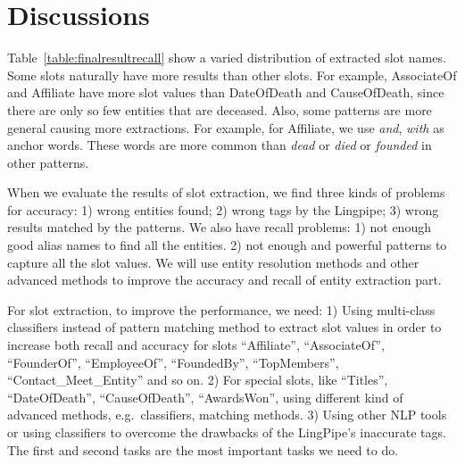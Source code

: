 

\section{Discussions}


Table~\ref{table:finalresultrecall} show a varied distribution of extracted slot names. Some slots naturally have more results than other slots. For example, AssociateOf and Affiliate have more slot values than DateOfDeath and CauseOfDeath, since there are only so few entities that are deceased. Also, some patterns are more general causing more extractions. For example, for Affiliate, we use \textit{and}, \textit{with} as anchor words. These words are more common than \textit{dead} or \textit{died} or \textit{founded} in other patterns. 







When we evaluate the results of slot extraction, we find three kinds of problems for accuracy: 1) wrong entities found; 2) wrong tags by the Lingpipe; 3) wrong results matched by the patterns.  We also have 
recall problems: 1) not enough good alias names to find all the entities. 2) not enough and powerful patterns to capture all the slot values. We will use entity resolution methods and other advanced methods to improve 
the accuracy and recall of entity extraction part. 

For slot extraction, to improve the performance, we need: 1) Using multi-class classifiers instead of pattern matching method to extract slot values in order to increase both recall and accuracy for slots ``Affiliate'', ``AssociateOf'', ``FounderOf'', ``EmployeeOf'', ``FoundedBy'', ``TopMembers'', ``Contact\_Meet\_Entity'' and so on. 2) For special slots, like ``Titles'', ``DateOfDeath'', ``CauseOfDeath'', ``AwardsWon'', using different kind of advanced methods, e.g.\ classifiers, matching methods. 3) Using other NLP tools or using classifiers to overcome the drawbacks of the LingPipe’s inaccurate tags. The first and second tasks are the most important tasks we need to do.

